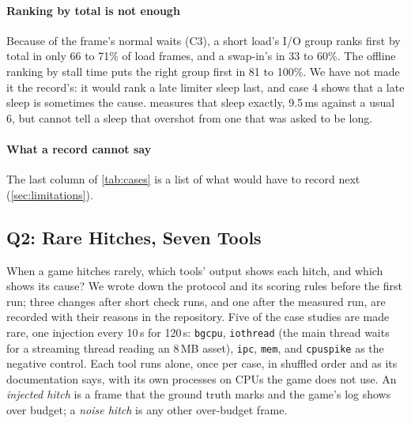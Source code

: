 \paragraph{Ranking by total is not enough} Because of the frame's normal
waits (C3), a short load's I/O group ranks first by total in only 66 to
71\% of load frames, and a swap-in's in 33 to 60\%. The offline ranking by
stall time puts the right group first in 81 to 100\%. We
have not made it the record's: it would rank a late limiter sleep last, and
case 4 shows that a late sleep is sometimes the cause. \sys measures that
sleep exactly, 9.5\,ms against a usual 6, but cannot tell a sleep that
overshot from one that was asked to be long.

\paragraph{What a record cannot say} The last column of \autoref{tab:cases} is
a list of what \sys would have to record next (\autoref{sec:limitations}).

\subsection{Q2: Rare Hitches, Seven Tools}
\label{sec:eval-catch}

When a game hitches rarely, which tools' output shows each hitch, and which
shows its cause? We wrote down the protocol and its scoring rules before
the first run; three changes after short check runs, and one after
the measured run, are recorded with their reasons in the repository. Five of
the case studies are made rare, one injection every 10\,s for 120\,s:
\texttt{bgcpu}, \texttt{iothread} (the main thread waits for a streaming
thread reading an 8\,MB asset), \texttt{ipc}, \texttt{mem}, and
\texttt{cpuspike} as the negative control. Each tool runs alone, once per
case, in shuffled order and as its documentation says, with its own
processes on CPUs the game does not use. An \emph{injected hitch} is a frame
that the ground truth marks and the game's log shows over budget; a
\emph{noise hitch} is any other over-budget frame.

